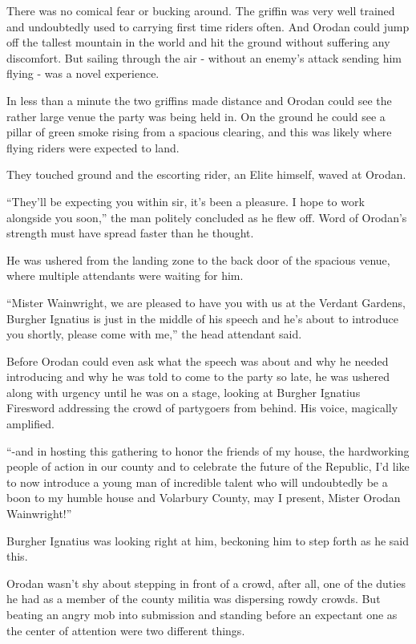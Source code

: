 \documentclass[a4paper,10pt]{book}
\begin{document}
There was no comical fear or bucking around. The griffin was very well trained and undoubtedly used to carrying first time riders often. And Orodan could jump off the tallest mountain in the world and hit the ground without suffering any discomfort. But sailing through the air - without an enemy’s attack sending him flying - was a novel experience.\par
In less than a minute the two griffins made distance and Orodan could see the rather large venue the party was being held in. On the ground he could see a pillar of green smoke rising from a spacious clearing, and this was likely where flying riders were expected to land.\par
They touched ground and the escorting rider, an Elite himself, waved at Orodan.\par
“They’ll be expecting you within sir, it’s been a pleasure. I hope to work alongside you soon,” the man politely concluded as he flew off. Word of Orodan’s strength must have spread faster than he thought.\par
He was ushered from the landing zone to the back door of the spacious venue, where multiple attendants were waiting for him.\par
“Mister Wainwright, we are pleased to have you with us at the Verdant Gardens, Burgher Ignatius is just in the middle of his speech and he’s about to introduce you shortly, please come with me,” the head attendant said.\par
Before Orodan could even ask what the speech was about and why he needed introducing and why he was told to come to the party so late, he was ushered along with urgency until he was on a stage, looking at Burgher Ignatius Firesword addressing the crowd of partygoers from behind. His voice, magically amplified.\par
“-and in hosting this gathering to honor the friends of my house, the hardworking people of action in our county and to celebrate the future of the Republic, I’d like to now introduce a young man of incredible talent who will undoubtedly be a boon to my humble house and Volarbury County, may I present, Mister Orodan Wainwright!”\par
Burgher Ignatius was looking right at him, beckoning him to step forth as he said this.\par
Orodan wasn’t shy about stepping in front of a crowd, after all, one of the duties he had as a member of the county militia was dispersing rowdy crowds. But beating an angry mob into submission and standing before an expectant one as the center of attention were two different things.\par
\end{document}
